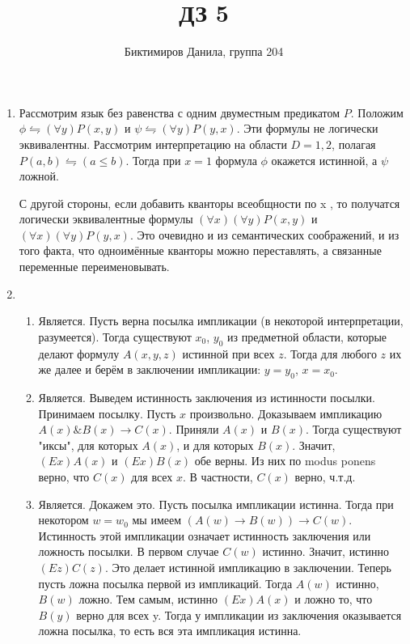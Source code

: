 \documentclass[11pt]{article}
\begin{document}
	
	\author{Биктимиров Данила, группа 204}
	\title{ДЗ 5}
	\date{}
	\maketitle
	
	\medskip
	
	\begin{enumerate}
		\item Рассмотрим язык без равенства с одним двуместным предикатом $P$. Положим $\phi \leftrightharpoons (\forall y)P(x,y)$ и $\psi \leftrightharpoons (\forall y)P(y,x)$. Эти формулы не логически эквивалентны. Рассмотрим интерпретацию на области $D={1,2}$, полагая $P(a,b)\leftrightharpoons(a\le b)$. Тогда при $x=1$ формула $\phi$ окажется истинной, а $\psi$ ложной.
		
		С другой стороны, если добавить кванторы всеобщности по x , то получатся логически эквивалентные формулы $(\forall x)(\forall y)P(x,y)$ и $(\forall x)(\forall y)P(y,x)$. Это очевидно и из семантических соображений, и из того факта, что одноимённые кванторы можно переставлять, а связанные переменные переименовывать.
		\item \begin{enumerate}
			\item Является. Пусть верна посылка импликации (в некоторой интерпретации, разумеется). Тогда существуют $x_0$, $y_0$ из предметной области, которые делают формулу $A(x,y,z)$ истинной при всех $z$. Тогда для любого $z$ их же далее и берём в заключении импликации: $y=y_0$, $x=x_0$.
			
			\item Является. Выведем истинность заключения из истинности посылки. Принимаем посылку. Пусть $x$ произвольно. Доказываем импликацию $A(x)\& B(x)\to C(x)$. Приняли $A(x)$ и $B(x)$. Тогда существуют "иксы", для которых $A(x)$, и для которых $B(x)$. Значит, $(Ex)A(x)$ и $(Ex)B(x)$ обе верны. Из них по modus ponens верно, что $C(x)$ для всех $x$. В частности, $C(x)$ верно, ч.т.д.
			
			\item Является. Докажем это. Пусть посылка импликации истинна. Тогда при некотором $w=w_0$ мы имеем $(A(w)\to B(w))\to C(w)$. Истинность этой импликации означает истинность заключения или ложность посылки. В первом случае $C(w)$ истинно. Значит, истинно $(Ez)C(z)$. Это делает истинной импликацию в заключении. Теперь пусть ложна посылка первой из импликаций. Тогда $A(w)$ истинно, $B(w)$ ложно. Тем самым, истинно $(Ex)A(x)$ и ложно то, что $B(y)$ верно для всех y. Тогда у импликации из заключения оказывается ложна посылка, то есть вся эта импликация истинна.
			

\end{enumerate}
\end{enumerate}
\end{document}
